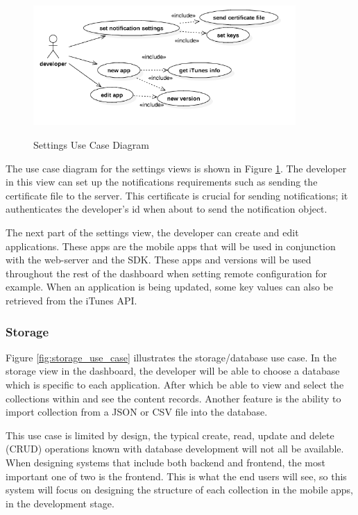 \begin{figure}[!h]
    \caption{Settings Use Case Diagram}
    \centering
    \includegraphics[width=100mm]{images/use_cases/settings_uc}
    \label{fig:settings_uc}
\end{figure}

The use case diagram for the settings views is shown in Figure \ref{fig:settings_uc}. The developer in this view can set up the notifications requirements such as sending the certificate file to the server. This certificate is crucial for sending notifications; it authenticates the developer's id when about to send the notification object.

The next part of the settings view, the developer can create and edit applications. These apps are the mobile apps that will be used in conjunction with the web-server and the SDK. These apps and versions will be used throughout the rest of the dashboard when setting remote configuration for example. When an application is being updated, some key values can also be retrieved from the iTunes API.

\subsubsection{Storage} \label{d-db:storage}

Figure \ref{fig:storage_use_case} illustrates the storage/database use case. In the storage view in the dashboard, the developer will be able to choose a database which is specific to each application. After which be able to view and select the collections within and see the content records. Another feature is the ability to import collection from a JSON or CSV file into the database.

This use case is limited by design, the typical create, read, update and delete (CRUD) operations known with database development will not all be available. When designing systems that include both backend and frontend, the most important one of two is the frontend. This is what the end users will see, so this system will focus on designing the structure of each collection in the mobile apps, in the development stage. 

